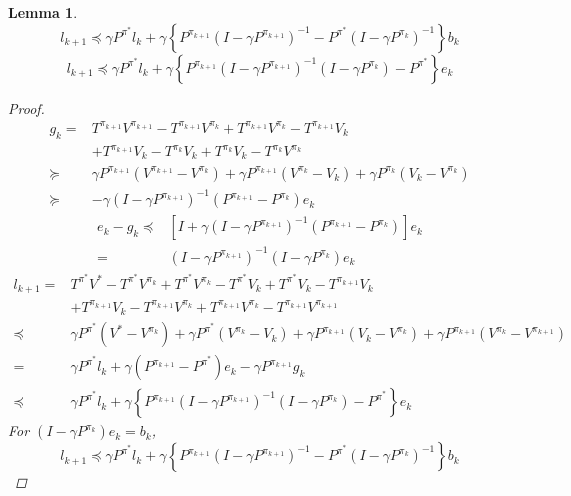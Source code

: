 \documentclass[a4paper]{article}
\newtheorem{lemma}{Lemma}
\begin{document}
\begin{lemma}
    \[
        l_{k+1} \preceq \gamma P^{\pi^*}l_k + \gamma \left\{  P^{\pi_{k+1}}{( I - \gamma P^{\pi_{k+1}})}^{-1}  - P^{\pi^*} {(I - \gamma P^{\pi_k})}^{-1}\right\} b_k
    \]
    \[
        l_{k+1} \preceq \gamma P^{\pi^*} l_k + \gamma \left\{ P^{\pi_{k+1}}{( I - \gamma P^{\pi_{k+1}})}^{-1} (I - \gamma P^{\pi_k}) - P^{\pi^*} \right\} e_k
    \]
    
    \begin{proof}
        \begin{align*}
            g_k =& T^{\pi_{k+1}} V^{\pi_{k+1}} - T^{\pi_{k+1}} V^{\pi_k} + T^{\pi_{k+1}} V^{\pi_k} - T^{\pi_{k+1}}V_k\\
            & + T^{\pi_{k+1}} V_k - T^{\pi_k} V_k + T^{\pi_k} V_k - T^{\pi_k} V^{\pi_k} \\
            \succeq& \gamma P^{\pi_{k+1}} (V^{\pi_{k+1}} - V^{\pi_k}) + \gamma P^{\pi_{k+1}}(V^{\pi_k} - V_k) + \gamma P^{\pi_k}(V_k - V^{\pi_k}) \\
            \succeq& - \gamma {(I - \gamma P^{\pi_{k+1}})}^{-1} (P^{\pi_{k+1}} - P^{\pi_k})e_k
        \end{align*}
        \begin{align*}
            e_k - g_k \preceq& \left[ I + \gamma {(I - \gamma P^{\pi_{k+1}})}^{-1} (P^{\pi_{k+1}} - P^{\pi_k}) \right] e_k\\
            =& {(I - \gamma P^{\pi_{k+1}})}^{-1} (I - \gamma P^{\pi_k}) e_k
        \end{align*}
        \begin{align*}
            l_{k+1} =& T^{\pi^*} V^* - T^{\pi^*} V^{\pi_k} + T^{\pi^*} V^{\pi_k} - T^{\pi^*} V_k + T^{\pi^*} V_k - T^{\pi_{k+1}}V_k \\
            &+ T^{\pi_{k+1}}V_k - T^{\pi_{k+1}}V^{\pi_k} + T^{\pi_{k+1}}V^{\pi_k} - T^{\pi_{k+1}} V^{\pi_{k+1}} \\
            \preceq& \gamma P^{\pi^*} (V^{*} - V^{\pi_k}) + \gamma P^{\pi^*}(V^{\pi_k} - V_k) + \gamma P^{\pi_{k+1}} (V_k - V^{\pi_k}) + \gamma P^{\pi_{k+1}} (V^{\pi_k} - V^{\pi_{k+1}})\\
            =& \gamma P^{\pi^*} l_k  + \gamma (P^{\pi_{k+1}} - P^{\pi^*}) e_k - \gamma P^{\pi_{k+1}} g_k\\
            \preceq& \gamma P^{\pi^*} l_k + \gamma \left\{ P^{\pi_{k+1}}{( I - \gamma P^{\pi_{k+1}})}^{-1} (I - \gamma P^{\pi_k}) - P^{\pi^*} \right\} e_k
        \end{align*}
        For $ (I - \gamma P^{\pi_k})e_k = b_k $,
        \[
            l_{k+1} \preceq \gamma P^{\pi^*}l_k + \gamma \left\{  P^{\pi_{k+1}}{( I - \gamma P^{\pi_{k+1}})}^{-1}  - P^{\pi^*} {(I - \gamma P^{\pi_k})}^{-1}\right\} b_k
        \]
    \end{proof}
\end{lemma}
\end{document}

